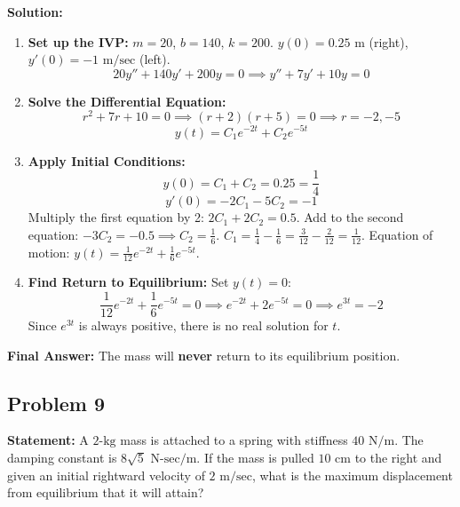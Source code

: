 \documentclass[11pt]{article}
\begin{document}
\textbf{Solution:}
\begin{enumerate}
    \item \textbf{Set up the IVP:}
    $m = 20$, $b = 140$, $k = 200$. $y(0) = 0.25 \text{ m}$ (right), $y'(0) = -1 \text{ m/sec}$ (left).
    \[ 20y'' + 140y' + 200y = 0 \implies y'' + 7y' + 10y = 0 \]
    
    \item \textbf{Solve the Differential Equation:}
    \[ r^2 + 7r + 10 = 0 \implies (r+2)(r+5) = 0 \implies r = -2, -5 \]
    \[ y(t) = C_1 e^{-2t} + C_2 e^{-5t} \]
    
    \item \textbf{Apply Initial Conditions:}
    \[ y(0) = C_1 + C_2 = 0.25 = \frac{1}{4} \]
    \[ y'(0) = -2C_1 - 5C_2 = -1 \]
    Multiply the first equation by 2: $2C_1 + 2C_2 = 0.5$.
    Add to the second equation: $-3C_2 = -0.5 \implies C_2 = \frac{1}{6}$.
    $C_1 = \frac{1}{4} - \frac{1}{6} = \frac{3}{12} - \frac{2}{12} = \frac{1}{12}$.
    Equation of motion: $y(t) = \frac{1}{12}e^{-2t} + \frac{1}{6}e^{-5t}$.
    
    \item \textbf{Find Return to Equilibrium:}
    Set $y(t) = 0$:
    \[ \frac{1}{12}e^{-2t} + \frac{1}{6}e^{-5t} = 0 \implies e^{-2t} + 2e^{-5t} = 0 \implies e^{3t} = -2 \]
    Since $e^{3t}$ is always positive, there is no real solution for $t$.
\end{enumerate}
\textbf{Final Answer:} The mass will \textbf{never} return to its equilibrium position.

\subsection{Problem 9}
\textbf{Statement:} A $2\text{-kg}$ mass is attached to a spring with stiffness $40 \text{ N/m}$. The damping constant is $8\sqrt{5} \text{ N-sec/m}$. If the mass is pulled $10 \text{ cm}$ to the right and given an initial rightward velocity of $2 \text{ m/sec}$, what is the maximum displacement from equilibrium that it will attain?
\end{document}
